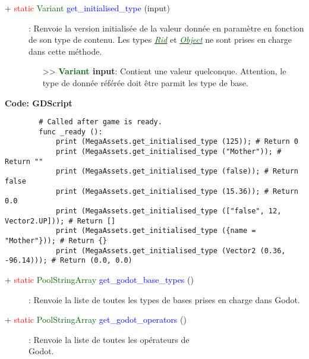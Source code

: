\documentclass[a4paper, 11pt]{article}
\begin{document}
	\begin{description}
		\item [+ \textcolor{red}{static} \textcolor{darkgreen}{Variant} \textcolor{blue}
		{get\_initialised\_type} (input)]: Renvoie la version initialisée de la valeur donnée en paramètre 
		en fonction de son type de contenu. Les types
		\href{https://docs.godotengine.org/fr/stable/classes/class_rid.html}
		{\textit{\textcolor{darkgreen}{Rid}}} et
		\href{https://docs.godotengine.org/fr/stable/classes/class_object.html}
		{\textit{\textcolor{darkgreen}{Object}}} ne sont prises en charge dans cette méthode.
		\begin{itemize}
			\item[>> \textbf{\textcolor{darkgreen}{Variant} input}:] Contient une valeur quelconque. 
			Attention, le type de donnée référée doit être parmit les type de base.\\
		\end{itemize}
	\end{description}
	\textbf{Code: GDScript}
	\begin{lstlisting}
		# Called after game is ready.
		func _ready ():
			print (MegaAssets.get_initialised_type (125)); # Return 0
			print (MegaAssets.get_initialised_type ("Mother")); # Return ""
			print (MegaAssets.get_initialised_type (false)); # Return false
			print (MegaAssets.get_initialised_type (15.36)); # Return 0.0
			print (MegaAssets.get_initialised_type (["false", 12, Vector2.UP])); # Return []
			print (MegaAssets.get_initialised_type ({name = "Mother"})); # Return {}
			print (MegaAssets.get_initialised_type (Vector2 (0.36, -96.14))); # Return (0.0, 0.0)
	\end{lstlisting}
	\begin{description}
		\item [+ \textcolor{red}{static} \textcolor{darkgreen}{PoolStringArray} \textcolor{blue}
		{get\_godot\_base\_types} ()]: Renvoie la liste de toutes les types de bases prises en charge dans
		Godot.\\
	\end{description}
	\begin{description}
		\item [+ \textcolor{red}{static} \textcolor{darkgreen}{PoolStringArray} \textcolor{blue}
		{get\_godot\_operators} ()]: Renvoie la liste de toutes les opérateurs de \\Godot.\\
	\end{description}
\end{document}
